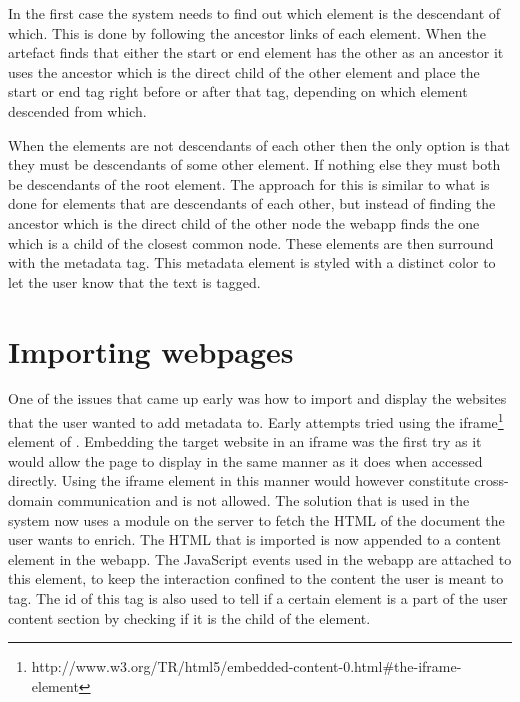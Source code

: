 In the first case the system needs to find out which element is the descendant of which.
This is done by following the ancestor links of each element.
When the artefact finds that either the start or end element has the other as an ancestor it uses the ancestor which is the direct
child of the other element and place the start or end tag right before or after that tag, depending on which element
descended from which.

When the elements are not descendants of each other then the only option is that they must be descendants of some other element.
If nothing else they must both be descendants of the root element.
The approach for this is similar to what is done for elements that are descendants of each other,
but instead of finding the ancestor which is the direct child of the other node the webapp finds the one which is a child of the
closest common node.
These elements are then surround with the metadata tag.
This metadata element is styled with a distinct color to let the user know that the text is tagged.

\section{Importing webpages}
One of the issues that came up early was how to import and display the websites that the user wanted to add metadata to.
Early attempts tried using the iframe\footnote{http://www.w3.org/TR/html5/embedded-content-0.html\#the-iframe-element}
element of .
Embedding the target website in an iframe was the first try as it would allow the page to display in the same manner
as it does when accessed directly.
Using the iframe element in this manner would however constitute cross-domain communication and is not allowed.
The solution that is used in the system now uses a module on the server to fetch the HTML of the document the user wants to enrich.
The HTML that is imported is now appended to a content element in the webapp.
The JavaScript events used in the webapp are attached to this element,
to keep the interaction confined to the content the user is meant to tag.
The id of this tag is also used to tell if a certain element is a part of the user content section by checking if it is
the child of the element.

